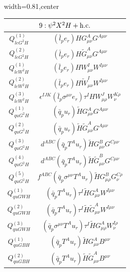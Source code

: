 \begin{table}[H]
\begin{center}
\begin{adjustbox}{width=0.81\textwidth,center}
\small
\begin{minipage}[t]{5.6cm}
\renewcommand{\arraystretch}{1.5}
\begin{tabular}[t]{c|c}
\multicolumn{2}{c}{\boldmath$9:\psi^2X^2H + \mathrm{h.c.}$} \\
\hline
$Q_{leG^2H}^{(1)}$  &  $(\bar l_p e_r) H G^A_{\mu\nu} G^{A\mu\nu}$ \\
% 
$Q_{leG^2H}^{(2)}$  &  $(\bar l_p e_r) H \widetilde G^A_{\mu\nu} G^{A\mu\nu}$ \\
% 
$Q_{leW^2H}^{(1)}$  &  $(\bar l_p e_r) H W^I_{\mu\nu} W^{I\mu\nu} $ \\
% 
$Q_{leW^2H}^{(2)}$  &  $(\bar l_p e_r) H \widetilde W^I_{\mu\nu} W^{I\mu\nu}$ \\
% 
$Q_{leW^2H}^{(3)}$  &  $\epsilon^{IJK} (\bar l_p \sigma^{\mu\nu} e_r) \tau^I H W_{\mu\rho}^J W_\nu^{K\rho}$ \\
%
$Q_{quG^2H}^{(1)}$  &  $(\bar q_p u_r) \widetilde H G^A_{\mu\nu} G^{A\mu\nu} $ \\
% 
$Q_{quG^2H}^{(2)}$  &  $(\bar q_p u_r) \widetilde H \widetilde G^A_{\mu\nu} G^{A\mu\nu} $ \\
% 
$Q_{quG^2H}^{(3)}$  &  $d^{ABC} (\bar q_p T^A u_r) \widetilde H G^B_{\mu\nu} G^{C\mu\nu} $ \\
% 
$Q_{quG^2H}^{(4)}$  &  $d^{ABC} (\bar q_p T^A u_r) \widetilde H \widetilde G^B_{\mu\nu} G^{C\mu\nu} $ \\
% 
$Q_{quG^2H}^{(5)}$  &  $f^{ABC} (\bar q_p \sigma^{\mu\nu} T^A u_r) \widetilde H G_{\mu\rho}^B G_\nu^{C\rho}$ \\
%
$Q_{quGWH}^{(1)}$  &  $(\bar q_p T^A u_r) \tau^I \widetilde H G^A_{\mu\nu} W^{I\mu\nu} $ \\
% 
$Q_{quGWH}^{(2)}$  &  $(\bar q_p T^A u_r) \tau^I \widetilde H \widetilde G^A_{\mu\nu} W^{I\mu\nu} $ \\
% 
$Q_{quGWH}^{(3)}$  &  $(\bar q_p \sigma^{\mu\nu} T^A u_r) \tau^I \widetilde H G_{\mu\rho}^A W_\nu^{I\rho}$ \\
%
$Q_{quGBH}^{(1)}$  &  $(\bar q_p T^A u_r) \widetilde H G^A_{\mu\nu} B^{\mu\nu} $ \\
% 
$Q_{quGBH}^{(2)}$  &  $(\bar q_p T^A u_r) \widetilde H \widetilde G^A_{\mu\nu} B^{\mu\nu} $ \\

\end{tabular}
\end{minipage}
\end{adjustbox}
\end{center}
\end{table}
